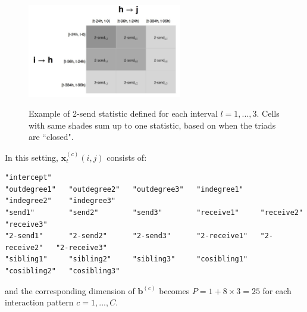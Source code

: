 \documentclass[a4paper]{article}
\begin{document}
 \begin{figure}[ht]
 	\centering
 	\includegraphics[width=0.6\textwidth]{triadtable.jpg} 
 	\label{fig:sim1diag}
 	\caption{Example of 2-send statistic defined for each interval $l=1,...,3$. Cells with same shades sum up to one statistic, based on when the triads are ``closed".}
 \end{figure}
In this setting, $\boldsymbol{x}^{(c)}_{t}(i, j)$ consists of:
\begin{verbatim}
"intercept"    
"outdegree1"   "outdegree2"   "outdegree3"   "indegree1"    "indegree2"    "indegree3"   
"send1"        "send2"        "send3"        "receive1"     "receive2"     "receive3"     
"2-send1"      "2-send2"      "2-send3"      "2-receive1"   "2-receive2"   "2-receive3"  
"sibling1"     "sibling2"     "sibling3"     "cosibling1"   "cosibling2"   "cosibling3"   
\end{verbatim}
and the corresponding dimension of  $\boldsymbol{b}^{(c)}$ becomes $P =  1 + 8 \times 3= 25$ for each interaction pattern $c=1,...,C$.
\end{document}

